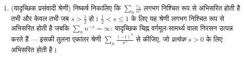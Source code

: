 \begin{problem}
\begin{enumerate}[resume]
        $0 < \theta <
        1$ वाले $Z \geq 0$ के लिए
        \[
        \P\bigl(Z > \theta\,\E Z\bigr) \;\geq\; (1 -
        \theta)^2\,\frac{(\E Z)^2}{\E Z^2}
        \]
        \emph{($\E Z$ को स्तर $\theta\E Z$ पर विभाजित कीजिए और ऊपरी टुकड़े
        पर कोशी--श्वार्ज़ लगाइए)}।
        (ख) दर्शाइए कि $\E T_n^4 \leq 3s_n^4$।
        (ग) $\P\bigl(\abs{T_n} > \frac{s_n}2\bigr)
        \geq \frac3{16}$ निकालिए और निष्कर्ष निकालिए कि $\sum_nx_n\varepsilon_n$ लगभग निश्चित
        रूप से अपसारित होती है; अतः द्विभाजन
        \[
        \sum_nx_n\varepsilon_n\ \text{लगभग निश्चित रूप से अभिसरित}
        \iff \sum_nx_n^2 < \infty .
        \]
  \item (यादृच्छिक प्रसंवादी श्रेणी) निष्कर्ष निकालिए कि $\sum_n\frac{\varepsilon_n}{n^s}$
        लगभग निश्चित रूप से अभिसरित होती है तभी और केवल तभी जब
        $s > \frac12$ हो। $\frac12 < s \leq
        1$ के लिए यह श्रेणी लगभग निश्चित रूप से
        अभिसरित होती है जबकि $\sum_nn^{-s} = \infty$: यादृच्छिक चिह्न वर्गमूल-सामर्थ्य
        वाला निरसन उत्पन्न करते हैं --- इसकी तुलना एकांतर श्रेणी
        $\sum_n\frac{(-1)^n}{n^s}$ से कीजिए, जो \emph{प्रत्येक} $s > 0$ के लिए अभिसरित
        होती है।
\end{enumerate}


\end{problem}
